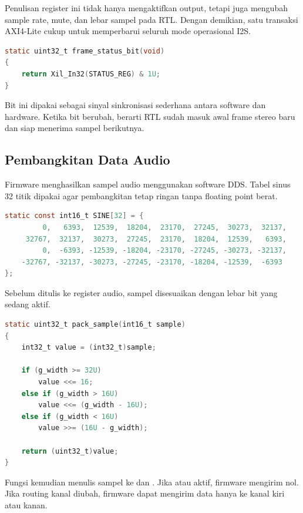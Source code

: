 Penulisan register ini tidak hanya mengaktifkan output, tetapi juga mengubah sample rate, mute, dan lebar sampel pada RTL. Dengan demikian, satu transaksi AXI4-Lite cukup untuk memperbarui seluruh mode operasional I2S.

\begin{lstlisting}[language=C,caption={Pembacaan status latch dari register \texttt{STATUS}.},label={lst:ch4-status-bit}]
static uint32_t frame_status_bit(void)
{
    return Xil_In32(STATUS_REG) & 1U;
}
\end{lstlisting}

Bit ini dipakai sebagai sinyal sinkronisasi sederhana antara software dan hardware. Ketika bit berubah, berarti RTL sudah masuk awal frame stereo baru dan siap menerima sampel berikutnya.

\subsection{Pembangkitan Data Audio}

Firmware menghasilkan sampel audio menggunakan software DDS. Tabel sinus 32 titik dipakai agar pembangkitan tetap ringan tanpa floating point berat.

\begin{lstlisting}[language=C,caption={Tabel sinus 32 titik yang dipakai untuk software DDS.},label={lst:ch4-sine-table}]
static const int16_t SINE[32] = {
         0,   6393,  12539,  18204,  23170,  27245,  30273,  32137,
     32767,  32137,  30273,  27245,  23170,  18204,  12539,   6393,
         0,  -6393, -12539, -18204, -23170, -27245, -30273, -32137,
    -32767, -32137, -30273, -27245, -23170, -18204, -12539,  -6393
};
\end{lstlisting}

Sebelum ditulis ke register audio, sampel disesuaikan dengan lebar bit yang sedang aktif.

\begin{lstlisting}[language=C,caption={Penyesuaian lebar sampel sebelum ditulis ke register data.},label={lst:ch4-pack-sample}]
static uint32_t pack_sample(int16_t sample)
{
    int32_t value = (int32_t)sample;

    if (g_width >= 32U)
        value <<= 16;
    else if (g_width > 16U)
        value <<= (g_width - 16U);
    else if (g_width < 16U)
        value >>= (16U - g_width);

    return (uint32_t)value;
}
\end{lstlisting}

Fungsi  kemudian menulis sampel ke  dan . Jika  atau  aktif, firmware mengirim nol. Jika routing kanal diubah, firmware dapat mengirim data hanya ke kanal kiri atau kanan.

